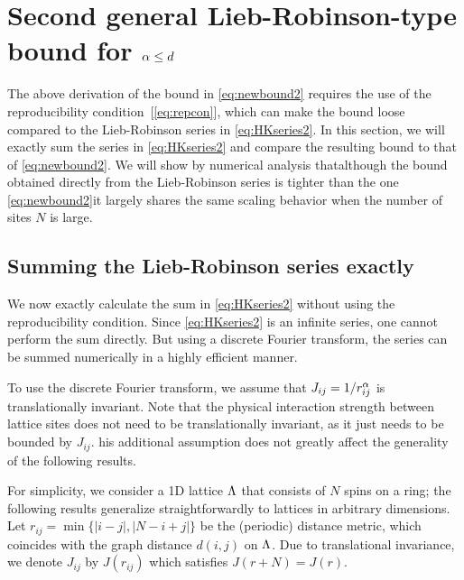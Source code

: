 \section{Second general Lieb-Robinson-type bound for \texorpdfstring{$\alpha \le d$}{α <= d}}
\label{sec:exactsumbound}
The above derivation of the bound in \cref{eq:newbound2} requires the use of the reproducibility condition~[\cref{eq:repcon}], which can make the bound loose compared to the Lieb-Robinson series in \cref{eq:HKseries2}. In this section, we will exactly sum the series in \cref{eq:HKseries2} and compare the resulting bound to that of \cref{eq:newbound2}. We will show by numerical analysis that\dash although the bound obtained directly from the Lieb-Robinson series is tighter than the one \cref{eq:newbound2}\dash it largely shares the same scaling behavior when the number of sites $N$ is large.

\subsection{Summing the Lieb-Robinson series exactly}
\label{sec:exactsumboundproof}
We now exactly calculate the sum in \cref{eq:HKseries2} without using the reproducibility condition. Since \cref{eq:HKseries2} is an infinite series, one cannot perform the sum directly. But using a discrete Fourier transform, the series can be summed numerically in a highly efficient manner.

To use the discrete Fourier transform, we assume that $J_{ij}=1/r_{ij}^{\alpha}$ is translationally invariant. Note that the physical interaction strength between lattice sites does not need to be translationally invariant, as it just needs to be bounded by $J_{ij}$. his additional assumption does not greatly affect the generality of the following results.

For simplicity, we consider a 1D lattice $\Lambda$ that consists of $N$ spins on a ring; the following results generalize straightforwardly to lattices in arbitrary dimensions. Let $r_{ij} = \min\{|i-j|,|N-i+j|\}$ be the (periodic) distance metric, which coincides with the graph distance $d(i,j)$ on $\Lambda$. Due to translational invariance, we denote $J_{ij}$ by $J(r_{ij})$ which satisfies $J(r+N) = J(r)$.

